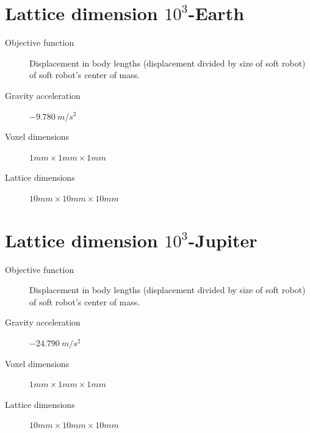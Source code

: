 \section{Lattice dimension $10^3$-Earth}
\label{Settings-size10-earth}
\begin{small}
\begin{description}
\item[Objective function]{Displacement in body lengths (displacement divided by size of soft robot) of soft robot's center of mass.}
\item[Gravity acceleration]{$-9.780\ m/s^2$}
\item[Voxel dimensions]{$1mm \times 1mm \times 1mm$}
\item[Lattice dimensions]{$10mm \times 10mm \times 10mm$}
\end{description}
\end{small}

\section{Lattice dimension $10^3$-Jupiter}
\label{Settings-size10-jupiter}
\begin{small}
\begin{description}
\item[Objective function]{Displacement in body lengths (displacement divided by size of soft robot) of soft robot's center of mass.}
\item[Gravity acceleration]{$-24.790\ m/s^2$}
\item[Voxel dimensions]{$1mm \times 1mm \times 1mm$}
\item[Lattice dimensions]{$10mm \times 10mm \times 10mm$}
\end{description}
\end{small}

